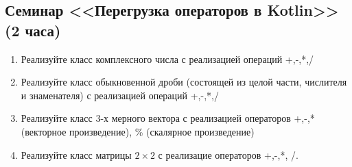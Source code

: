 \subsection{Семинар <<Перегрузка операторов в Kotlin>> (2 часа)} 

\begin{enumerate}
\item Реализуйте класс комплексного числа с реализацией операций +,-,*,/
\item Реализуйте класс обыкновенной дроби (состоящей из целой части, числителя и знаменателя) с реализацией операций +,-,*,/
\item Реализуйте класс 3-х мерного вектора с реализацией операторов +,-,* (векторное произведение), \% (скалярное произведение)
\item Реализуйте класс матрицы $2\times 2$ с реализацие операторов +,-,*, /.
\end{enumerate}

